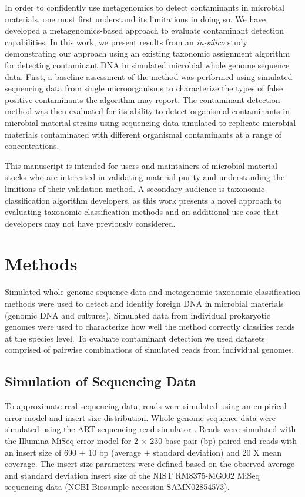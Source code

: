 \documentclass[fleqn,10pt,lineno]{wlpeerj}\usepackage[]{graphicx}\usepackage[]{color}
\begin{document}
In order to confidently use metagenomics to detect contaminants in microbial materials, one must first understand its limitations in doing so.  We have developed a metagenomics-based approach to evaluate contaminant detection capabilities.  In this work, we present results from an \textit{in-silico} study demonstrating our approach using an existing taxonomic assignment algorithm for detecting contaminant DNA in simulated microbial whole genome sequence data.
First, a baseline assessment of the method was performed using simulated sequencing data from single microorganisms to characterize the types of false positive contaminants the algorithm may report.
The contaminant detection method was then evaluated for its ability to detect organismal contaminants in microbial material strains using sequencing data simulated to replicate microbial materials contaminated with different organismal contaminants at a range of concentrations.   

This manuscript is intended for users and maintainers of microbial material stocks who are interested in validating material purity and understanding the limitions of their validation method. A secondary audience is taxonomic classification algorithm developers, as this work presents a novel approach to evaluating taxonomic classification methods and an additional use case that developers may not have previously considered.

\section*{Methods}
Simulated whole genome sequence data and metagenomic taxonomic classification methods were used to detect and identify foreign DNA in microbial materials (genomic DNA and cultures).
Simulated data from individual prokaryotic genomes were used to characterize how well the method correctly classifies reads at the species level.
To evaluate contaminant detection we used datasets comprised of pairwise combinations of simulated reads from individual genomes.

\subsection*{Simulation of Sequencing Data}
To approximate real sequencing data, reads were simulated using an empirical error model and insert size distribution.
Whole genome sequence data were simulated using the ART sequencing read simulator \citep{Huang2012}. 
Reads were simulated with the Illumina MiSeq error model for 2 $\times$ 230 base pair (bp) paired-end reads with an insert size of 690 $\pm$ 10 bp (average $\pm$ standard deviation) and 20 X mean coverage.
The insert size parameters were defined based on the observed average and standard deviation insert size of the NIST RM8375-MG002 MiSeq sequencing data \citep{olson2016pepr} (NCBI Biosample accession SAMN02854573).
\end{document}
